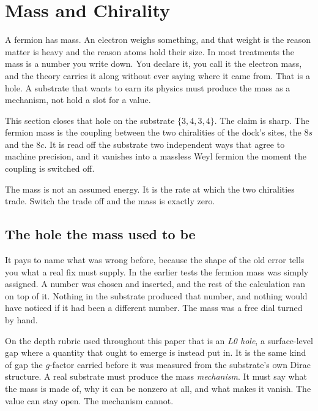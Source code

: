 \section{Mass and Chirality}

A fermion has mass. An electron weighs something, and that weight is the reason matter is heavy and the reason atoms hold their size. In most treatments the mass is a number you write down. You declare it, you call it the electron mass, and the theory carries it along without ever saying where it came from. That is a hole. A substrate that wants to earn its physics must produce the mass as a mechanism, not hold a slot for a value.

This section closes that hole on the substrate $\{3,4,3,4\}$. The claim is sharp. The fermion mass is the coupling between the two chiralities of the dock's sites, the $8s$ and the $8c$. It is read off the substrate two independent ways that agree to machine precision, and it vanishes into a massless Weyl fermion the moment the coupling is switched off.

\begin{principle}
The mass is not an assumed energy. It is the rate at which the two chiralities trade. Switch the trade off and the mass is exactly zero.
\end{principle}

\subsection{The hole the mass used to be}

It pays to name what was wrong before, because the shape of the old error tells you what a real fix must supply. In the earlier tests the fermion mass was simply assigned. A number was chosen and inserted, and the rest of the calculation ran on top of it. Nothing in the substrate produced that number, and nothing would have noticed if it had been a different number. The mass was a free dial turned by hand.

On the depth rubric used throughout this paper that is an \emph{L0 hole}, a surface-level gap where a quantity that ought to emerge is instead put in. It is the same kind of gap the $g$-factor carried before it was measured from the substrate's own Dirac structure. A real substrate must produce the mass \emph{mechanism}. It must say what the mass is made of, why it can be nonzero at all, and what makes it vanish. The value can stay open. The mechanism cannot.

